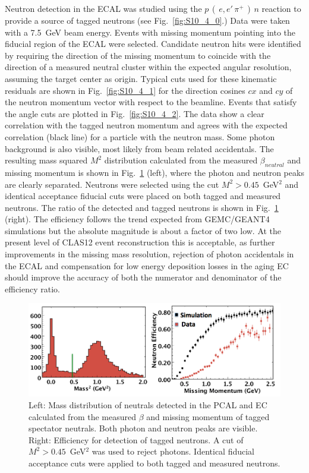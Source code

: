 Neutron detection in the ECAL was studied using the $p\,(\,e,e'\,\pi^+\,)\,n$ reaction to provide a source of
tagged neutrons (see Fig.~\ref{fig:S10_4_0}.) Data were taken with a 7.5~GeV beam energy. Events with missing
momentum pointing into the fiducial region of the ECAL were selected. Candidate neutron hits were identified by
requiring the direction of the missing momentum to coincide with the direction of a measured neutral cluster within
the expected angular resolution, assuming the target center as origin. Typical cuts used for these kinematic
residuals are shown in Fig.~\ref{fig:S10_4_1} for the direction cosines $cx$ and $cy$ of the neutron momentum
vector with respect to the beamline. Events that satisfy the angle cuts are plotted in Fig.~\ref{fig:S10_4_2}. The
data show a clear correlation with the tagged neutron momentum and agrees with the expected correlation (black
line) for a particle with the neutron mass. Some photon background is also visible, most likely from beam related
accidentals. The resulting mass squared $M^2$ distribution calculated from the measured $\beta_{neutral}$ and
missing momentum is shown in Fig.~\ref{fig:S10_4_3} (left), where the photon and neutron peaks are clearly
separated. Neutrons were selected using the cut $M^2 > 0.45$~GeV$^2$ and identical acceptance fiducial cuts
were placed on both tagged and measured neutrons. The ratio of the detected and tagged neutrons is shown in
Fig.~\ref{fig:S10_4_3} (right). The efficiency follows the trend expected from GEMC/GEANT4 simulations but
the absolute magnitude is about a factor of two low. At the present level of CLAS12 event reconstruction this is
acceptable, as further improvements in the missing mass resolution,  rejection of photon accidentals in the ECAL
and compensation for low energy deposition losses in the aging EC should improve the accuracy of both the numerator
and denominator of the efficiency ratio. 

\begin{figure}[h]
\centering
\includegraphics[width=1.0\columnwidth,keepaspectratio]{img/S10_4_3.png}
\caption[]{Left: Mass distribution of neutrals detected in the PCAL and EC calculated from the measured $\beta$
  and missing momentum of tagged spectator neutrals. Both photon and neutron peaks are visible. Right: Efficiency
  for detection of tagged neutrons. A cut of $M^2>0.45$~GeV$^2$ was used to reject photons.  Identical fiducial
  acceptance cuts were applied to both tagged and measured neutrons.}
\label{fig:S10_4_3}
\end{figure}
